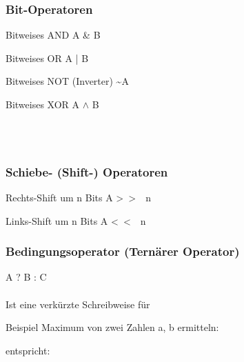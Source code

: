 				\hspace*{0.5cm}
				\begin{minipage}[t]{9 cm}
					\subsubsection{Bit-Operatoren}
						\begin{compactitem}
							\item Bitweises AND A \& B
							\item Bitweises OR A | B
							\item Bitweises NOT (Inverter) \textasciitilde A
							\item Bitweises XOR A $\wedge$ B 
						\end{compactitem}	
				\end{minipage}\\\\
				\begin{minipage}[t]{9 cm}
					\subsubsection{Schiebe- (Shift-) Operatoren}
						\begin{compactitem}
							\item Rechts-Shift um n Bits A \textgreater \ \textgreater \ \ n
							\item Links-Shift um n Bits A \textless \  \textless \ \ n
						\end{compactitem}
				\end{minipage}
				\hspace*{0.5cm}
				\begin{minipage}[t]{9 cm}
					\subsubsection{Bedingungsoperator (Ternärer Operator)}
						A ? B : C\\\\
						Ist eine verkürzte Schreibweise für
						
						\vspace*{0.5cm}
						Beispiel Maximum von zwei Zahlen a, b ermitteln:
						
						entspricht:
							
				\end{minipage}
